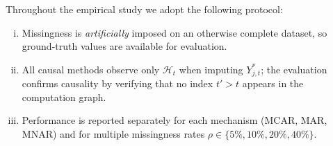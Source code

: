 \begin{assumption}
\label{ass:eval_protocol}
Throughout the empirical study we adopt the following protocol:
\begin{enumerate}[(i)]
  \item Missingness is \emph{artificially} imposed on an otherwise complete
        dataset, so ground-truth values are available for evaluation.
  \item All causal methods observe only $\mathcal{H}_t$ when imputing
        $Y_{j,t}^*$; the evaluation confirms causality by verifying that no
        index $t'>t$ appears in the computation graph.
  \item Performance is reported separately for each mechanism (MCAR, MAR,
        MNAR) and for multiple missingness rates
        $\rho\in\{5\%,10\%,20\%,40\%\}$.
\end{enumerate}
\end{assumption}